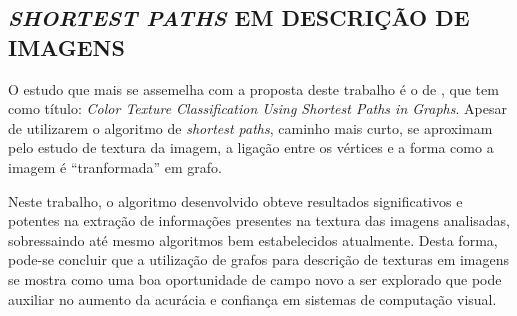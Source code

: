 \subsection{\textit{SHORTEST PATHS} EM DESCRIÇÃO DE IMAGENS}
\label{subsec:trabalho-jarbas}

\par O estudo que mais se assemelha com a proposta deste trabalho é o de , que tem como título: \textit{Color Texture Classification Using Shortest Paths in Graphs}. Apesar de utilizarem o algoritmo de \textit{shortest paths}, caminho mais curto, se aproximam pelo estudo de textura da imagem, a ligação entre os vértices e a forma como a imagem é ``tranformada'' em grafo.

\par Neste trabalho, o algoritmo desenvolvido obteve resultados significativos e potentes na extração de informações presentes na textura das imagens analisadas, sobressaindo até mesmo algoritmos bem estabelecidos atualmente. Desta forma, pode-se concluir que a utilização de grafos para descrição de texturas em imagens se mostra como uma boa oportunidade de campo novo a ser explorado que pode auxiliar no aumento da acurácia e confiança em sistemas de computação visual.
